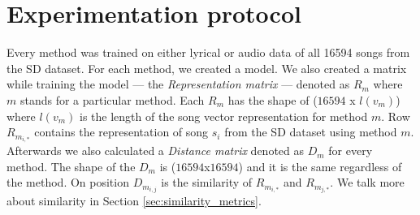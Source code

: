 \section{Experimentation protocol}
Every method was trained on either lyrical or audio data of all 16594 songs from the SD dataset.
For each method, we created a model. We also created a matrix while training the model --- the \textit{Representation matrix} --- denoted as  $R_m$ where $m$ stands for a particular method. Each $R_m$ has the shape of ($16594$ x $l(v_m) $) where $l(v_m)$ is the length of the song vector representation for method $m$. Row $R_{m_{i,*}}$ contains the representation of song $s_i$ from the SD dataset using method $m$. \\
Afterwards we also calculated a \textit{Distance matrix} denoted as $D_m$ for every method. The shape of the $D_m$ is ($16594 $x$ 16594$) and it is the same regardless of the method. On position $D_{m_{i,j}}$ is the similarity of $R_{m_{i,*}}$ and $R_{m_{j,*}}$. We talk more about similarity in Section \ref{sec:similarity_metrics}. \\

